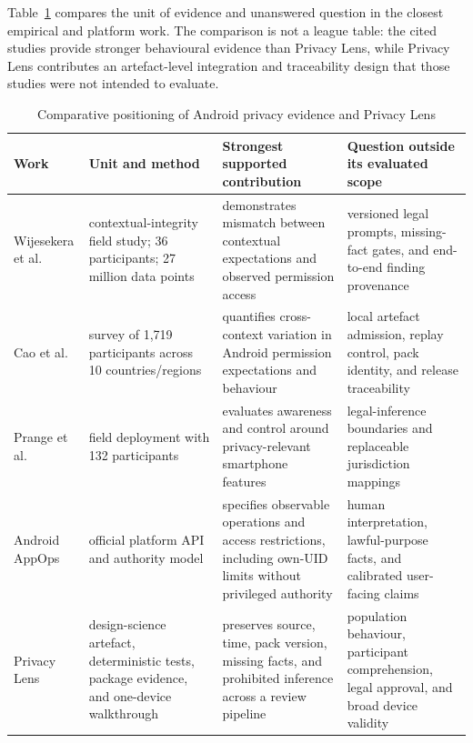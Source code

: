 Table~\ref{tab:related-work-positioning} compares the unit of evidence and unanswered question in the closest empirical and platform work. The comparison is not a league table: the cited studies provide stronger behavioural evidence than Privacy Lens, while Privacy Lens contributes an artefact-level integration and traceability design that those studies were not intended to evaluate.

\begin{table}[H]
\centering
\scriptsize
\caption{Comparative positioning of Android privacy evidence and Privacy Lens}
\label{tab:related-work-positioning}
\begin{tabular}{@{}>{\raggedright\arraybackslash}p{}>{\raggedright\arraybackslash}p{}>{\raggedright\arraybackslash}p{}>{\raggedright\arraybackslash}p{}@{}}
\toprule
Work & Unit and method & Strongest supported contribution & Question outside its evaluated scope \\
\midrule
Wijesekera et al. \cite{wijesekera2015} & contextual-integrity field study; 36 participants; 27 million data points & demonstrates mismatch between contextual expectations and observed permission access & versioned legal prompts, missing-fact gates, and end-to-end finding provenance \\
Cao et al. \cite{cao2021} & survey of 1,719 participants across 10 countries/regions & quantifies cross-context variation in Android permission expectations and behaviour & local artefact admission, replay control, pack identity, and release traceability \\
Prange et al. \cite{prange2024} & field deployment with 132 participants & evaluates awareness and control around privacy-relevant smartphone features & legal-inference boundaries and replaceable jurisdiction mappings \\
Android AppOps \cite{androidappops2026} & official platform API and authority model & specifies observable operations and access restrictions, including own-UID limits without privileged authority & human interpretation, lawful-purpose facts, and calibrated user-facing claims \\
Privacy Lens & design-science artefact, deterministic tests, package evidence, and one-device walkthrough & preserves source, time, pack version, missing facts, and prohibited inference across a review pipeline & population behaviour, participant comprehension, legal approval, and broad device validity \\
\bottomrule
\end{tabular}
\end{table}

